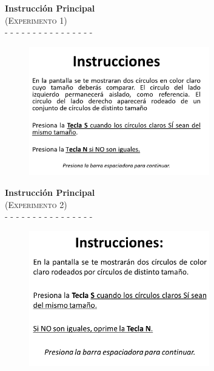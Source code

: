 \documentclass[a4paper ]{article}
\begin{document}
\begin{center}
{\LARGE \textbf{Instrucción Principal}}\\
{\large \textsc{(Experimento 1)}}\\
-  -  -  -  -  -  -  -  -  -  -  -  -  -  -  -
\smallskip
\end{center}
\vspace{3mm}
\begin{figure}[th]
\centering
\includegraphics[width=0.7\textwidth]{Figures/Inst_1b} 
\end{figure}
\clearpage






\begin{center}
{\LARGE \textbf{Instrucción Principal}}\\
{\large \textsc{(Experimento 2)}}\\
-  -  -  -  -  -  -  -  -  -  -  -  -  -  -  -
\smallskip
\end{center}
\vspace{3mm}
\begin{figure}[th]
\centering
\includegraphics[width=0.7\textwidth]{Figures/Inst_1} 
\end{figure}
\clearpage
\end{document}
